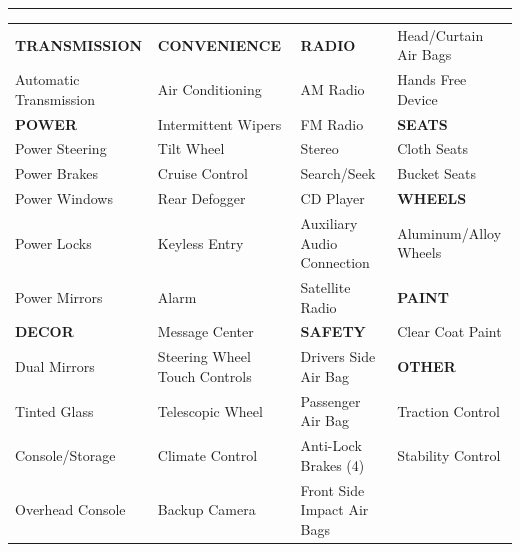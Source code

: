 \documentclass[letterpaper,10pt]{article}
\newcommand{\hrulefull}[1]{\par\noindent\rule{\textwidth}{#1}\par}
\begin{document}
\vspace{18pt}
\hrulefull{0.72pt}
\vspace{3.5pt}
\begin{tabular}{@{\hspace{24.4pt}}w{l}{134.9pt}w{l}{134.9pt}w{l}{135.2pt}w{l}{110pt}@{}}
  \textbf{TRANSMISSION}  & \textbf{CONVENIENCE}           & \textbf{RADIO}                 & Head/Curtain Air Bags\\
  Automatic Transmission & Air Conditioning               & AM Radio                       & Hands Free Device\\
  \textbf{POWER}         & Intermittent Wipers            & FM Radio                       & \textbf{SEATS}\\
  Power Steering         & Tilt Wheel                     & Stereo                         & Cloth Seats\\
  Power Brakes           & Cruise Control                 & Search/Seek                    & Bucket Seats\\
  Power Windows          & Rear Defogger                  & CD Player                      & \textbf{WHEELS}\\
  Power Locks            & Keyless Entry                  & Auxiliary Audio Connection     & Aluminum/Alloy Wheels\\
  Power Mirrors          & Alarm                          & Satellite Radio                & \textbf{PAINT}\\
  \textbf{DECOR}         & Message Center                 & \textbf{SAFETY}                & Clear Coat Paint\\
  Dual Mirrors           & Steering Wheel Touch Controls  & Drivers Side Air Bag           & \textbf{OTHER}\\
  Tinted Glass           & Telescopic Wheel               & Passenger Air Bag              & Traction Control\\
  Console/Storage        & Climate Control                & Anti-Lock Brakes (4)           & Stability Control\\
  Overhead Console       & Backup Camera                  & Front Side Impact Air Bags     & \\
\end{tabular}
\end{document}
